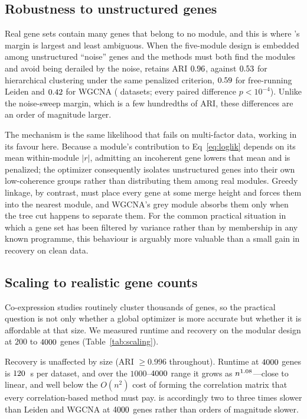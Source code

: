 \subsection*{Robustness to unstructured genes}
Real gene sets contain many genes that belong to no module, and this is where
\tool{}'s margin is largest and least ambiguous. When the five-module design is
embedded among unstructured ``noise'' genes and the methods must both find the
modules and avoid being derailed by the noise, \tool{} retains ARI
$0.96{}$, against $0.53{}$ for hierarchical
clustering under the same penalized criterion, $0.59{}$ for
free-running Leiden and $0.42{}$ for WGCNA
(\NSeeds{} datasets; every paired difference $p<10^{-4}$). Unlike the noise-sweep
margin, which is a few hundredths of ARI, these differences are an order of magnitude larger.

The mechanism is the same likelihood that fails on multi-factor data, working in
its favour here. Because a module's contribution to Eq~\eqref{eq:loglik} depends
on its mean within-module $\lvert r\rvert$, admitting an incoherent gene lowers
that mean and is penalized; the optimizer consequently isolates unstructured
genes into their own low-coherence groups rather than distributing them among
real modules. Greedy linkage, by contrast, must place every gene at some merge
height and forces them into the nearest module, and WGCNA's grey module absorbs
them only when the tree cut happens to separate them. For the common practical
situation in which a gene set has been filtered by variance rather than by
membership in any known programme, this behaviour is arguably more valuable than
a small gain in recovery on clean data.

\subsection*{Scaling to realistic gene counts}
Co-expression studies routinely cluster thousands of genes, so the practical
question is not only whether a global optimizer is more accurate but whether it
is affordable at that size. We measured runtime and recovery on the modular
design at $200$ to $4000{}$ genes (Table~\ref{tab:scaling}).

Recovery is unaffected by size (ARI $\ge0.996$ throughout). Runtime at
$4000{}$ genes is $120{}$~s per dataset, and over the
$1000$--$4000{}$ range it grows as $n^{1.08{}}$---close to
linear, and well below the $O(n^2)$ cost of forming the correlation matrix that
every correlation-based method must pay. \tool{} is accordingly two to three
times slower than Leiden and WGCNA at $4000{}$ genes rather than orders
of magnitude slower.

